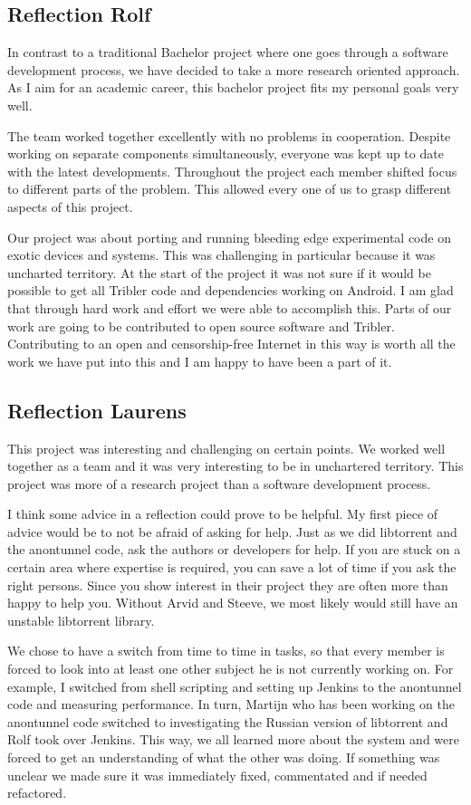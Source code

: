 		\subsection{Reflection Rolf}
			In contrast to a traditional Bachelor project where one goes through a software development process, we have decided to take a more research oriented approach. As I aim for an academic career, this bachelor project fits my personal goals very well.
		
			The team worked together excellently with no problems in cooperation. Despite working on separate components simultaneously, everyone was kept up to date with the latest developments. Throughout the project each member shifted focus to different parts of the problem. This allowed every one of us to grasp different aspects of this project.
		
			Our project was about porting and running bleeding edge experimental code on exotic devices and systems. This was challenging in particular because it was uncharted territory. At the start of the project it was not sure if it would be possible to get all Tribler code and dependencies working on Android. I am glad that through hard work and effort we were able to accomplish this. Parts of our work are going to be contributed to open source software and Tribler. Contributing to an open and censorship-free Internet in this way is worth all the work we have put into this and I am happy to have been a part of it.
		
		\subsection{Reflection Laurens}
			This project was interesting and challenging on certain points. We worked well together as a team and it was very interesting to be in unchartered territory. This project was more of a research project than a software development process.
			
			I think some advice in a reflection could prove to be helpful. My first piece of advice would be to not be afraid of asking for help.
			Just as we did libtorrent and the anontunnel code, ask the authors or developers for help. If you are stuck on a certain area where expertise is required, you can save a lot of time if you ask the right persons.
			Since you show interest in their project they are often more than happy to help you. Without Arvid and Steeve, we most likely would still have an unstable libtorrent library.
			
			
			We chose to have a switch from time to time in tasks, so that every member is forced to look into at least one other subject he is not currently working on. For example, I switched from shell scripting and setting up Jenkins to the anontunnel code and measuring performance. In turn, Martijn who has been working on the anontunnel code switched to investigating the Russian version of libtorrent and Rolf took over Jenkins. This way, we all learned more about the system and were forced to get an understanding of what the other was doing. If something was unclear we made sure it was immediately fixed, commentated and if needed refactored.
			
